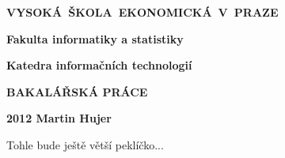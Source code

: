 \documentclass[a4paper,12pt]{report}
\begin{document}
\begin{titlepage}

\begin{center}

{\Large\textbf{\mbox{VYSOKÁ}~\nolinebreak \mbox{ŠKOLA}~\nolinebreak \mbox{EKONOMICKÁ}~\nolinebreak V~\nolinebreak \mbox{PRAZE}}}


{\huge\textbf{Fakulta informatiky a statistiky}}

{\Large\textbf{Katedra informačních technologií}}

{\Huge\textbf{BAKALÁŘSKÁ PRÁCE}}

{\Large\textbf{2012 \hfill Martin Hujer}}

\end{center}
\end{titlepage}

Tohle bude ještě větší peklíčko...


\end{document}
